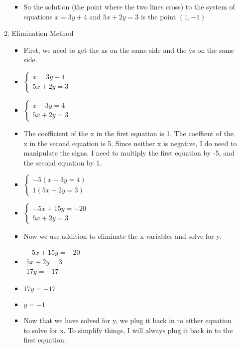 \documentclass{article}
\begin{document}
\begin{enumerate}
\begin{enumerate}
\begin{itemize}
    \item So the solution (the point where the two lines cross) to the system of equations $x=3y+4$ and $5x+2y=3$ is the point $(1,-1)$
    \end{itemize}
  \item Elimination Method
    \begin{itemize}
    \item First, we need to get the xs on the same side and the ys on the same side.
    \item []  $\left\{ \begin{array}{l}
              x=3y+4 \\
              5x+2y=3 \end{array} \right.$
    \item []  $\left\{ \begin{array}{l}
              x-3y=4 \\
              5x+2y=3 \end{array} \right.$
    \item The coefficient of the x in the first equation is 1. The coeffient of the x in the second equation is 5. Since neither x is negative, I do need to manipulate the signs. I need to multiply the first equation by -5, and the second equation by 1.
    \item []  $\left\{ \begin{array}{l}
              -5(x-3y=4) \\
              1(5x+2y=3) \end{array} \right.$
    \item []  $\left\{ \begin{array}{l}
              -5x+15y=-20 \\
              5x+2y=3 \end{array} \right.$
    \item Now we use addition to eliminate the x variables and solve for y.
    \item []  $\begin{array}{l}
              -5x+15y=-20 \\
              5x+2y=3 \\ \hline
              17y=-17 \end{array}$
    \item []  $17y=-17$
    \item []  $y=-1$
    \item Now that we have solved for y, we plug it back in to either equation to solve for x. To simplify things, I will always plug it back in to the first equation.

\end{itemize}
\end{enumerate}
\end{enumerate}
\end{document}
